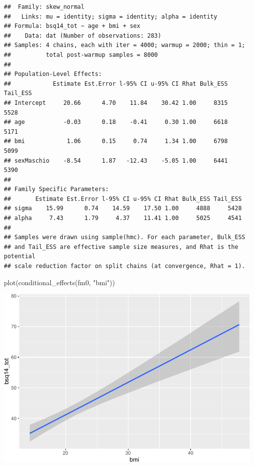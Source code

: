 \documentclass[
]{article}
\newenvironment{Shaded}{\begin{snugshade}}{\end{snugshade}}
\newcommand{\FunctionTok}[1]{\textcolor[rgb]{0.00,0.00,0.00}{#1}}
\newcommand{\NormalTok}[1]{#1}
\newcommand{\StringTok}[1]{\textcolor[rgb]{0.31,0.60,0.02}{#1}}
\begin{document}
\begin{verbatim}
##  Family: skew_normal 
##   Links: mu = identity; sigma = identity; alpha = identity 
## Formula: bsq14_tot ~ age + bmi + sex 
##    Data: dat (Number of observations: 283) 
## Samples: 4 chains, each with iter = 4000; warmup = 2000; thin = 1;
##          total post-warmup samples = 8000
## 
## Population-Level Effects: 
##            Estimate Est.Error l-95% CI u-95% CI Rhat Bulk_ESS Tail_ESS
## Intercept     20.66      4.70    11.84    30.42 1.00     8315     5528
## age           -0.03      0.18    -0.41     0.30 1.00     6618     5171
## bmi            1.06      0.15     0.74     1.34 1.00     6798     5099
## sexMaschio    -8.54      1.87   -12.43    -5.05 1.00     6441     5390
## 
## Family Specific Parameters: 
##       Estimate Est.Error l-95% CI u-95% CI Rhat Bulk_ESS Tail_ESS
## sigma    15.99      0.74    14.59    17.50 1.00     4888     5428
## alpha     7.43      1.79     4.37    11.41 1.00     5025     4541
## 
## Samples were drawn using sample(hmc). For each parameter, Bulk_ESS
## and Tail_ESS are effective sample size measures, and Rhat is the potential
## scale reduction factor on split chains (at convergence, Rhat = 1).
\end{verbatim}

\begin{Shaded}
\begin{Highlighting}[]
\FunctionTok{plot}\NormalTok{(}\FunctionTok{conditional\_effects}\NormalTok{(fm0, }\StringTok{"bmi"}\NormalTok{))}
\end{Highlighting}
\end{Shaded}

\includegraphics{050_quest_groups_files/figure-latex/unnamed-chunk-2-13.pdf}
\end{document}
